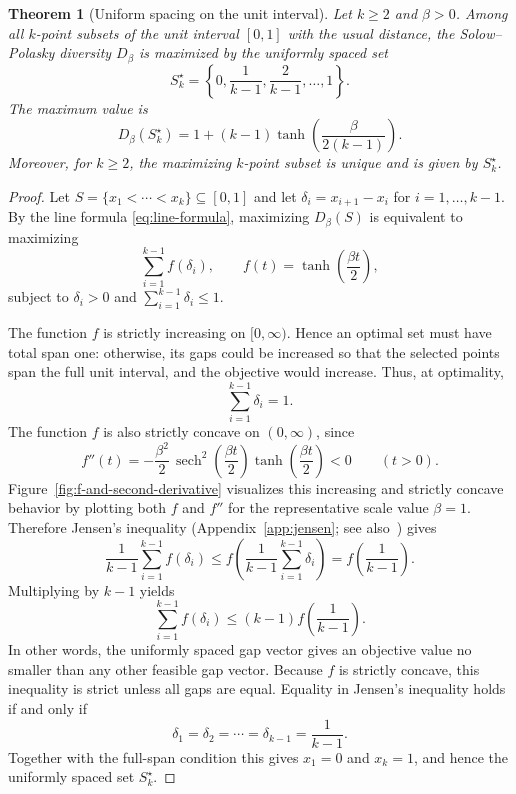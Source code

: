 \documentclass[12pt,a4paper]{article}
\newcommand{\plotbeta}{1}
\newtheorem{theorem}{Theorem}
\begin{document}
\begin{theorem}[Uniform spacing on the unit interval]
\label{thm:unit-line-uniform}
Let $k\geq 2$ and $\beta>0$.  Among all $k$-point subsets of the unit interval $[0,1]$ with the usual distance, the Solow--Polasky diversity $D_\beta$ is maximized by the uniformly spaced set
\[
 S_k^\star = \left\{0,\frac{1}{k-1},\frac{2}{k-1},\ldots,1\right\}.
\]
The maximum value is
\[
 D_\beta(S_k^\star)
 = 1 + (k-1)\tanh\!\left(\frac{\beta}{2(k-1)}\right).
\]
Moreover, for $k\geq 2$, the maximizing $k$-point subset is unique and is given by $S_k^\star$.
\end{theorem}

\begin{proof}
Let $S=\{x_1<\cdots<x_k\}\subseteq[0,1]$ and let $\delta_i=x_{i+1}-x_i$ for $i=1,\ldots,k-1$.  By the line formula \eqref{eq:line-formula}, maximizing $D_\beta(S)$ is equivalent to maximizing
\[
 \sum_{i=1}^{k-1} f(\delta_i),
 \qquad
 f(t)=\tanh\!\left(\frac{\beta t}{2}\right),
\]
subject to $\delta_i>0$ and $\sum_{i=1}^{k-1}\delta_i\leq 1$.

The function $f$ is strictly increasing on $[0,\infty)$.  Hence an optimal set must have total span one: otherwise, its gaps could be increased so that the selected points span the full unit interval, and the objective would increase.  Thus, at optimality,
\[
 \sum_{i=1}^{k-1}\delta_i=1.
\]
The function $f$ is also strictly concave on $(0,\infty)$, since
\[
 f''(t)
 = -\frac{\beta^2}{2}\,\operatorname{sech}^2\!\left(\frac{\beta t}{2}\right)
      \tanh\!\left(\frac{\beta t}{2}\right) <0
 \qquad (t>0).
\]
Figure~\ref{fig:f-and-second-derivative} visualizes this increasing and strictly concave behavior by plotting both $f$ and $f''$ for the representative scale value $\beta=\plotbeta$.
Therefore Jensen's inequality (Appendix~\ref{app:jensen}; see also~\cite{HardyLittlewoodPolya1952}) gives
\[
 \frac{1}{k-1}\sum_{i=1}^{k-1} f(\delta_i)
 \leq
 f\!\left(\frac{1}{k-1}\sum_{i=1}^{k-1}\delta_i\right)
 = f\!\left(\frac{1}{k-1}\right).
\]
Multiplying by $k-1$ yields
\[
 \sum_{i=1}^{k-1} f(\delta_i)
 \leq
 (k-1)f\!\left(\frac{1}{k-1}\right).
\]
In other words, the uniformly spaced gap vector gives an objective value no smaller than any other feasible gap vector.  Because $f$ is strictly concave, this inequality is strict unless all gaps are equal.  Equality in Jensen's inequality holds if and only if
\[
 \delta_1=\delta_2=\cdots=\delta_{k-1}=\frac{1}{k-1}.
\]
Together with the full-span condition this gives $x_1=0$ and $x_k=1$, and hence the uniformly spaced set $S_k^\star$.
\end{proof}
\end{document}
